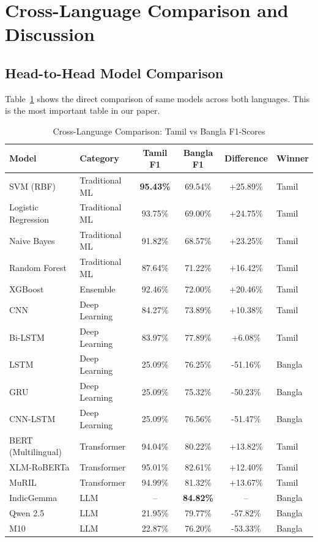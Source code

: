 \documentclass[conference]{IEEEtran}
\begin{document}
\section{Cross-Language Comparison and Discussion}

\subsection{Head-to-Head Model Comparison}

Table~\ref{tab:comparison} shows the direct comparison of same models across both languages. This is the most important table in our paper.

\begin{table}[!t]
\centering
\caption{Cross-Language Comparison: Tamil vs Bangla F1-Scores}
\label{tab:comparison}
\begin{tabular}{llcccl}
\toprule
\textbf{Model} & \textbf{Category} & \textbf{Tamil F1} & \textbf{Bangla F1} & \textbf{Difference} & \textbf{Winner} \\
\midrule
SVM (RBF) & Traditional ML & \textbf{95.43\%} & 69.54\% & +25.89\% & Tamil \\
Logistic Regression & Traditional ML & 93.75\% & 69.00\% & +24.75\% & Tamil \\
Naive Bayes & Traditional ML & 91.82\% & 68.57\% & +23.25\% & Tamil \\
Random Forest & Traditional ML & 87.64\% & 71.22\% & +16.42\% & Tamil \\
XGBoost & Ensemble & 92.46\% & 72.00\% & +20.46\% & Tamil \\
\midrule
CNN & Deep Learning & 84.27\% & 73.89\% & +10.38\% & Tamil \\
Bi-LSTM & Deep Learning & 83.97\% & 77.89\% & +6.08\% & Tamil \\
LSTM & Deep Learning & 25.09\% & 76.25\% & -51.16\% & Bangla \\
GRU & Deep Learning & 25.09\% & 75.32\% & -50.23\% & Bangla \\
CNN-LSTM & Deep Learning & 25.09\% & 76.56\% & -51.47\% & Bangla \\
\midrule
BERT (Multilingual) & Transformer & 94.04\% & 80.22\% & +13.82\% & Tamil \\
XLM-RoBERTa & Transformer & 95.01\% & 82.61\% & +12.40\% & Tamil \\
MuRIL & Transformer & 94.99\% & 81.32\% & +13.67\% & Tamil \\
\midrule
IndicGemma & LLM & -- & \textbf{84.82\%} & -- & Bangla \\
Qwen 2.5 & LLM & 21.95\% & 79.77\% & -57.82\% & Bangla \\
M10 & LLM & 22.87\% & 76.20\% & -53.33\% & Bangla \\
\bottomrule
\end{tabular}
\end{table}
\end{document}

